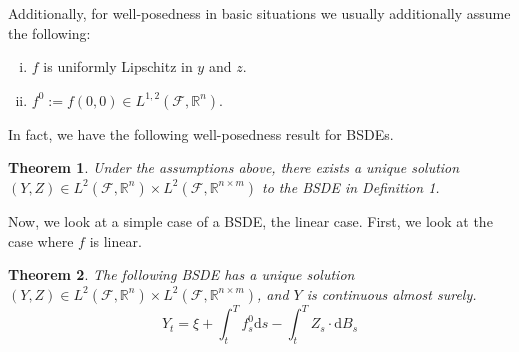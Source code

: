 \documentclass{amsart}
\newcommand{\rr}{\mathbb R}    %
\newcommand{\cF}{\mathcal{F}}
\newtheorem{theorem}{Theorem}
\theoremstyle{definition}
\theoremstyle{remark}
\numberwithin{equation}{section}
\begin{document}
Additionally, for well-posedness in basic situations we usually additionally assume the following:
\begin{enumerate}[i)]
    \item $f$ is uniformly Lipschitz in $y$ and $z$. 
    \item $f^0 := f(0, 0) \in L^{1,2}(\cF, \rr^n)$.
\end{enumerate}
In fact, we have the following well-posedness result for BSDEs.
\begin{theorem}
    Under the assumptions above, there exists a unique solution $(Y, Z) \in L^2(\cF, \rr^n) \times L^2(\cF, \rr^{n \times m})$ to the BSDE in Definition 1.
\end{theorem}
Now, we look at a simple case of a BSDE, the linear case. First, we look at the case where $f$ is linear.
\begin{theorem}
    The following BSDE has a unique solution $(Y, Z) \in L^2(\cF, \rr^n) \times L^2(\cF, \rr^{n \times m})$, and $Y$ is continuous almost surely. 
    \begin{equation}
        Y_t = \xi + \int_t^T f_s^0 \mathrm{d} s - \int_t^T Z_s \cdot \mathrm{d}B_s
    \end{equation}
\end{theorem}
\end{document}
